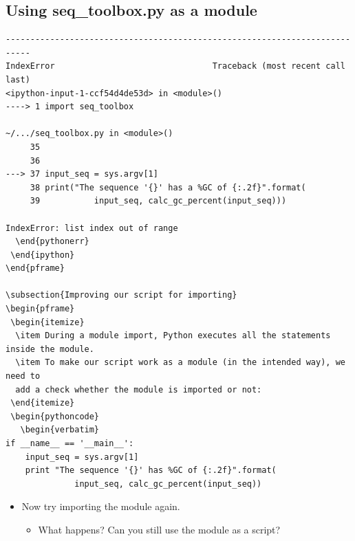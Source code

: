\documentclass[aspectratio=1610,slidestop]{beamer}
\newenvironment{ipython}
 {\begin{tcolorbox}[title=IPython,
                   title filled=false,
                   fonttitle=\scriptsize,
                   fontupper=\footnotesize,
                   enhanced,
                   colback=monokaibg,
                   drop small lifted shadow,
                   boxrule=0.1mm,
                   left=0.1cm,
                   arc=0mm,
                   colframe=black]}
 {\end{tcolorbox}}
\newcounter{cntr}
\renewcommand{\thecntr}{\texttt{[\arabic{cntr}]}}
\newenvironment{pythonin}[1]
{\VerbatimEnvironment
  \begin{minipage}[t]{0.11\linewidth}
   \textcolor{green}{\texttt{{\refstepcounter{cntr}In \thecntr:}}}
  \end{minipage}%
  \begin{minipage}[t]{0.89\linewidth}%
  \begin{verbatim}}
 {\end{verbatim}
 \end{minipage}}
\newenvironment{pythonerr}[1]
{\VerbatimEnvironment
  \begin{verbatim}}
 {\end{verbatim}}
\newenvironment{pythoncode}
 {\begin{tcolorbox}[title filled=false,
                    coltitle=LUMCDonkerblauw,
                    fonttitle=\scriptsize,
                    fontupper=\footnotesize,
                    enhanced,
                    drop small lifted shadow,
                    boxrule=0.1mm,
                    leftrule=5mm,
                    rulecolor=white,
                    left=0.1cm,
                    colback=white!92!black,
                    colframe=scriptback]}
 {\end{tcolorbox}}
\begin{document}
\subsection{Using seq\_toolbox.py as a module}

\begin{pframe}
 \begin{ipython}
  \begin{pythonerr}{python}
---------------------------------------------------------------------------
IndexError                                Traceback (most recent call last)
<ipython-input-1-ccf54d4de53d> in <module>()
----> 1 import seq_toolbox

~/.../seq_toolbox.py in <module>()
     35
     36
---> 37 input_seq = sys.argv[1]
     38 print("The sequence '{}' has a %
     39           input_seq, calc_gc_percent(input_seq)))

IndexError: list index out of range
  \end{pythonerr}
 \end{ipython}
\end{pframe}

\subsection{Improving our script for importing}
\begin{pframe}
 \begin{itemize}
  \item During a module import, Python executes all the statements inside the module.
  \item To make our script work as a module (in the intended way), we need to
  add a check whether the module is imported or not:
 \end{itemize}
 \begin{pythoncode}
   \begin{verbatim}
if __name__ == '__main__':
    input_seq = sys.argv[1]
    print "The sequence '{}' has %GC of {:.2f}".format(
              input_seq, calc_gc_percent(input_seq))
   \end{verbatim}
 \end{pythoncode}
 \begin{itemize}
  \item Now try importing the module again.
  \begin{itemize}
   \item What happens? Can you still use the module as a script?
  \end{itemize}
 \end{itemize}
\end{pframe}
\end{document}
